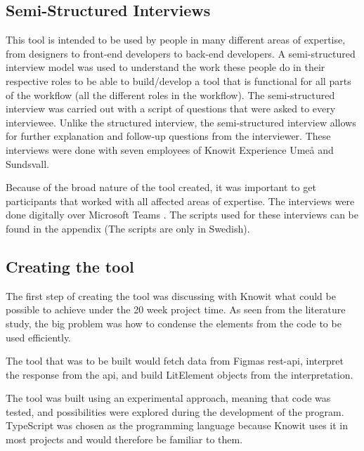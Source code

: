 
\subsection{Semi-Structured Interviews}%
\label{sub:inteviews}
This tool is intended to be used by people in many different areas of expertise, from designers to front-end developers to back-end developers. A semi-structured interview model was used \cite{galletta2013mastering} to understand the work these people do in their respective roles to be able to build/develop a tool that is functional for all parts of the workflow (all the different roles in the workflow). The semi-structured interview was carried out with a script of questions that were asked to every interviewee. Unlike the structured interview, the semi-structured interview allows for further explanation and follow-up questions from the interviewer. These interviews were done with seven employees of Knowit Experience Umeå and Sundsvall. 

Because of the broad nature of the tool created, it was important to get participants that worked with all affected areas of expertise. The interviews were done digitally over Microsoft Teams \cite{VideoConferencingMeetings}. The scripts used for these interviews can be found in the appendix (The scripts are only in Swedish). 

\subsection{Creating the tool}%
\label{sub:creatingTool}

The first step of creating the tool was discussing with Knowit what could be possible to achieve under the 20 week project time. As seen from the literature study, the big problem was how to condense the elements from the code to be used efficiently. 

The tool that was to be built would fetch data from Figmas \acrshort{rest}-\acrshort{api}, interpret the response from the \acrshort{api}, and build LitElement objects from the interpretation.

The tool was built using an experimental approach, meaning that code was tested, and possibilities were explored during the development of the program. TypeScript was chosen as the programming language because Knowit uses it in most projects and would therefore be familiar to them.

